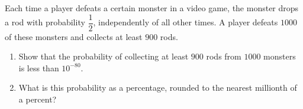 Each time a player defeats a certain monster in a video game, the monster drops a rod with probability $\dfrac12$, independently of all other times. A player defeats $1000$ of these monsters and collects at least $900$ rods.
\begin{enumerate}
\item[(a)] Show that the probability of collecting at least $900$ rods from $1000$ monsters is less than $10^{-80}$.
\item[(b)] What is this probability as a percentage, rounded to the nearest millionth of a percent?
\end{enumerate}
